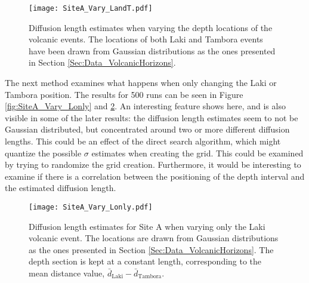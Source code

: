 \documentclass[../../CompleteThesis2/Complete_2ndDraft]{subfiles}
\begin{document}

\begin{figure}[!htb]
	\centering
	\texttt{[image: SiteA\_Vary\_LandT.pdf]}
	\caption[$\sigma$ variations, varying Laki and Tambora]{\small Diffusion length estimates when varying the depth locations of the volcanic events. The locations of both Laki and Tambora events have been drawn from Gaussian distributions as the ones presented in Section \ref{Sec:Data_VolcanicHorizons}.}
	\label{fig:SiteA_Vary_LandT}
\end{figure}

The next method examines what happens when only changing the Laki or Tambora position. The results for 500 runs can be seen in Figure \ref{fig:SiteA_Vary_Lonly} and \ref{fig:SiteA_Vary_Tonly}. An interesting feature shows here, and is also visible in some of the later results: the diffusion length estimates seem to not be Gaussian distributed, but concentrated around two or more different diffusion lengths. This could be an effect of the direct search algorithm, which might quantize the possible $\sigma$ estimates when creating the grid. This could be examined by trying to randomize the grid creation. Furthermore, it would be interesting to examine if there is a correlation between the positioning of the depth interval and the estimated diffusion length.  


\begin{figure}[!htb]
	\centering
	\texttt{[image: SiteA\_Vary\_Lonly.pdf]}
	\caption[$\sigma$ variations, varying only Laki]{\small Diffusion length estimates for Site A when varying only the Laki volcanic event. The locations are drawn from Gaussian distributions as the ones presented in Section \ref{Sec:Data_VolcanicHorizons}. The depth section is kept at a constant length, corresponding to the mean distance value, $\bar{d}_{\text{Laki}}-\bar{d}_{\text{Tambora}}$.}
	\label{fig:SiteA_Vary_Tonly}
\end{figure}
\end{document}
